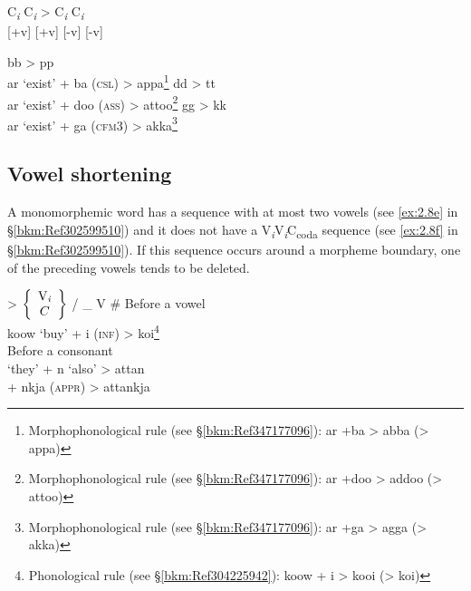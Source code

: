 \begin{exe}
\ex \gll C\textit{\textsubscript{i}}  C\textit{\textsubscript{i}}  >  C\textit{\textsubscript{i}}  C\textit{\textsubscript{i}}\footnotemark\\
 {[+v]}  [+v] {}   [-v]  [-v]\\
\ex\label{ex:2.20}
\begin{xlist}
\ex bb > pp\\
    ar   ‘exist’   +   ba   (\textsc{csl})   >   appa\footnote{Morphophonological rule (see §\ref{bkm:Ref347177096}): ar +ba > abba (> appa)}
\ex dd > tt\\
    ar   ‘exist’   +   doo   (\textsc{ass})   >   attoo\footnote{Morphophonological rule (see §\ref{bkm:Ref347177096}): ar +doo > addoo (> attoo)}
\ex gg > kk\\
    ar   ‘exist’   +   ga   (\textsc{cfm}3)   >   akka\footnote{Morphophonological rule (see §\ref{bkm:Ref347177096}): ar +ga > agga (> akka)}\\
\end{xlist}
\end{exe}

\subsection{Vowel shortening}
\label{bkm:Ref301832441}\hypertarget{RefHeadingToc395696982}{}
A monomorphemic word has a sequence with at most two vowels (see \ref{ex:2.8e} in §\ref{bkm:Ref302599510}) and it does not have a V\textit{\textsubscript{i}}V\textit{\textsubscript{i}}C\textsubscript{coda} sequence (see \ref{ex:2.8f} in §\ref{bkm:Ref302599510}). If this sequence occurs around a morpheme boundary, one of the preceding vowels tends to be deleted.

  {>}  $\left\{\begin{array}{c} \text{V\textit{\textsubscript{i}}} \\ C \end{array}  \right\}$  {/}  {\_} V    {\#}
\ex
\ea Before a vowel\\
   {koow}  {‘buy’}  {+}  {i}  {(\textsc{inf})}  {>}  {koi\footnote{Phonological rule (see §\ref{bkm:Ref304225942}): koow + i > kooi (> koi)}}\\
\ex Before a consonant\\
     {‘they’}  {+}  {n}    {‘also’}   {>}  {attan}\\
        {}         {}      {+}  {nkja}  {(\textsc{appr})}  {>}  {attankja}\\
\z
\z

